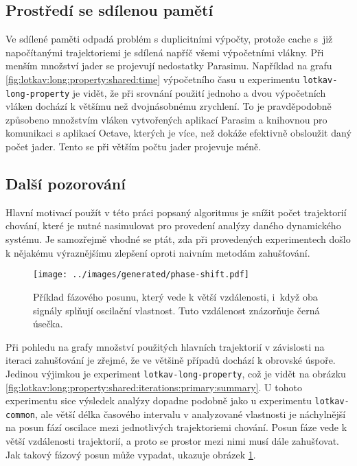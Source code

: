 \subsection{Prostředí se sdílenou pamětí}

Ve sdílené paměti odpadá problém s duplicitními výpočty, protože cache s~již napočítanými
trajektoriemi je sdílená napříč všemi výpočetními vlákny. Při menším množství jader se
projevují nedostatky Parasimu. Například na grafu \ref{fig:lotkav:long:property:shared:time} výpočetního času u experimentu \texttt{lotkav-long-property}
je vidět, že při srovnání použití jednoho a dvou výpočetních vláken dochází k většímu
než dvojnásobnému zrychlení. To je pravděpodobně způsobeno množstvím vlá\-ken vytvořených
aplikací Parasim a knihovnou pro komunikaci s aplikací Octave, kterých je více,
než dokáže efektivně obsloužit daný počet jader. Tento  se
při větším počtu jader projevuje méně.

\subsection{Další pozorování}

Hlavní motivací použít v této práci popsaný algoritmus je snížit počet trajektorií
chování, které je nutné nasimulovat pro provedení analýzy daného dynamického systému.
Je samozřejmě vhodné se ptát, zda při provedených experimentech došlo k nějakému
výraznějšímu zlepšení oproti naivním metodám zahušťování. 

\begin{figure}[h!]
\begin{center}
	\texttt{[image: ../images/generated/phase-shift.pdf]}
	\caption{Příklad fázového posunu, který vede k větší vzdálenosti, i~když oba signály splňují oscilační vlastnost. Tuto vzdálenost znázorňuje černá úsečka.}
	\label{fig:phase:shift}
\end{center}
\end{figure}

Při pohledu na grafy množství použitých hlavních trajektorií v závislosti na iteraci
zahušťování je zřejmé, že ve většině případů dochází k obrovské úspoře. Jedinou výjimkou
je experiment \texttt{lotkav-long-property}, což je vidět na obrázku \ref{fig:lotkav:long:property:shared:iterations:primary:summary}.
U tohoto experimentu sice výsledek analýzy dopadne podobně jako u experimentu \texttt{lotkav-common},
ale větší délka časového intervalu v analyzované vlastnosti je náchylnější na posun fází oscilace
mezi jednotlivých trajektoriemi chování. Posun fáze vede k větší vzdálenosti trajektorií,
a proto se prostor mezi nimi musí dále zahušťovat. Jak takový fázový posun může vypadat, ukazuje
obrázek \ref{fig:phase:shift}.


